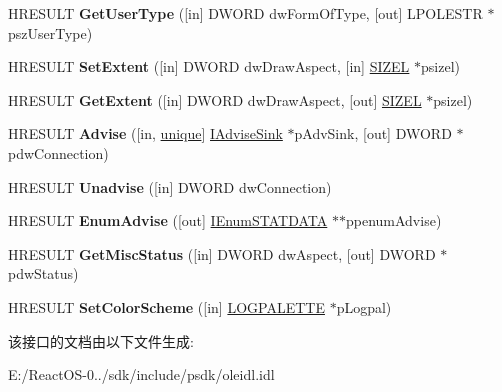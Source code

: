 \begin{DoxyCompactItemize}
H\+R\+E\+S\+U\+LT {\bfseries Get\+User\+Type} (\mbox{[}in\mbox{]} D\+W\+O\+RD dw\+Form\+Of\+Type, \mbox{[}out\mbox{]} L\+P\+O\+L\+E\+S\+TR $\ast$psz\+User\+Type)
\item 
\mbox{\label{interface_i_ole_object_a1e855557ed302759dae3593ca90e3952}} 
H\+R\+E\+S\+U\+LT {\bfseries Set\+Extent} (\mbox{[}in\mbox{]} D\+W\+O\+RD dw\+Draw\+Aspect, \mbox{[}in\mbox{]} \hyperlink{structtag_s_i_z_e}{S\+I\+Z\+EL} $\ast$psizel)
\item 
\mbox{\label{interface_i_ole_object_a7063d05b822c05467f3dab7c1ef8b981}} 
H\+R\+E\+S\+U\+LT {\bfseries Get\+Extent} (\mbox{[}in\mbox{]} D\+W\+O\+RD dw\+Draw\+Aspect, \mbox{[}out\mbox{]} \hyperlink{structtag_s_i_z_e}{S\+I\+Z\+EL} $\ast$psizel)
\item 
\mbox{\label{interface_i_ole_object_af00894c19c36a06d53fa50bff6aad469}} 
H\+R\+E\+S\+U\+LT {\bfseries Advise} (\mbox{[}in, \hyperlink{interfaceunique}{unique}\mbox{]} \hyperlink{interface_i_advise_sink}{I\+Advise\+Sink} $\ast$p\+Adv\+Sink, \mbox{[}out\mbox{]} D\+W\+O\+RD $\ast$pdw\+Connection)
\item 
\mbox{\label{interface_i_ole_object_ad0663ca46ae78b03949a0a3d1c11ae2c}} 
H\+R\+E\+S\+U\+LT {\bfseries Unadvise} (\mbox{[}in\mbox{]} D\+W\+O\+RD dw\+Connection)
\item 
\mbox{\label{interface_i_ole_object_ab3dec6b8163ab8a51a6ac149698d6eff}} 
H\+R\+E\+S\+U\+LT {\bfseries Enum\+Advise} (\mbox{[}out\mbox{]} \hyperlink{interface_i_enum_s_t_a_t_d_a_t_a}{I\+Enum\+S\+T\+A\+T\+D\+A\+TA} $\ast$$\ast$ppenum\+Advise)
\item 
\mbox{\label{interface_i_ole_object_a5e3a5178a8d84607036ca078b1ce0700}} 
H\+R\+E\+S\+U\+LT {\bfseries Get\+Misc\+Status} (\mbox{[}in\mbox{]} D\+W\+O\+RD dw\+Aspect, \mbox{[}out\mbox{]} D\+W\+O\+RD $\ast$pdw\+Status)
\item 
\mbox{\label{interface_i_ole_object_afe9c13446f32d5f04f58429aa07e57c0}} 
H\+R\+E\+S\+U\+LT {\bfseries Set\+Color\+Scheme} (\mbox{[}in\mbox{]} \hyperlink{structtag_l_o_g_p_a_l_e_t_t_e}{L\+O\+G\+P\+A\+L\+E\+T\+TE} $\ast$p\+Logpal)
\end{DoxyCompactItemize}


该接口的文档由以下文件生成\+:\begin{DoxyCompactItemize}
\item 
E\+:/\+React\+O\+S-\/0../sdk/include/psdk/oleidl.\+idl\end{DoxyCompactItemize}
